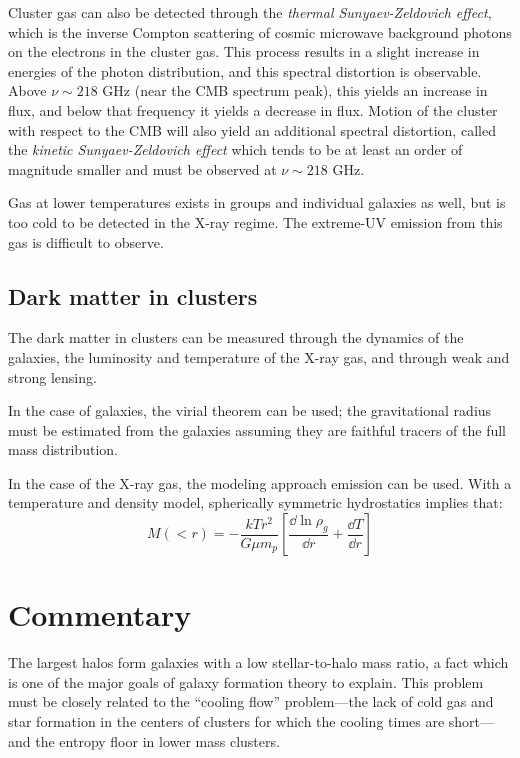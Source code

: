 Cluster gas can also be detected through the {\it thermal
Sunyaev-Zeldovich effect}, which is the inverse Compton scattering of
cosmic microwave background photons on the electrons in the cluster
gas. This process results in a slight increase in energies of the
photon distribution, and this spectral distortion is observable. Above
$\nu \sim 218$ GHz (near the CMB spectrum peak), this yields an
increase in flux, and below that frequency it yields a decrease in
flux. Motion of the cluster with respect to the CMB will also yield an
additional spectral distortion, called the {\it kinetic
Sunyaev-Zeldovich effect} which tends to be at least an order of
magnitude smaller and must be observed at $\nu \sim 218$ GHz.

Gas at lower temperatures exists in groups and individual galaxies as
well, but is too cold to be detected in the X-ray regime. The
extreme-UV emission from this gas is difficult to observe.

\subsection{Dark matter in clusters}

The dark matter in clusters can be measured through the dynamics of
the galaxies, the luminosity and temperature of the X-ray gas, and
through weak and strong lensing.

In the case of galaxies, the virial theorem can be used; the
gravitational radius must be estimated from the galaxies assuming they
are faithful tracers of the full mass distribution.

In the case of the X-ray gas, the modeling approach emission can be
used. With a temperature and density model, spherically symmetric
hydrostatics implies that:
\begin{equation}
M(<r) = - \frac{kTr^2}{G\mu m_p} \left[\frac{\dd \ln \rho_g}{\dd r}
+ \frac{\dd T}{\dd r}\right]
\end{equation}

\section{Commentary}

The largest halos form galaxies with a low stellar-to-halo mass ratio,
a fact which is one of the major goals of galaxy formation theory to
explain. This problem must be closely related to the ``cooling flow''
problem---the lack of cold gas and star formation in the centers of
clusters for which the cooling times are short---and the entropy floor
in lower mass clusters.

